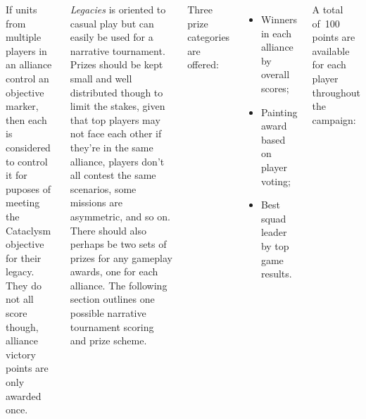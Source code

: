 \begin{columns}
 If units from multiple players in an
alliance control an objective marker, then each is considered to
control it for puposes of meeting the Cataclysm objective for their
legacy.  They do not all score though, alliance victory points are
only awarded once.

\vfill
\bigskip
\centerline{}
\clearpage


\emph{Legacies} is oriented to casual play but can easily be used for
a narrative tournament.  Prizes should be kept small and well
distributed though to limit the stakes, given that top players may not
face each other if they're in the same alliance, players don't all
contest the same scenarios, some missions are asymmetric, and so on.
There should also perhaps be two sets of prizes for any gameplay
awards, one for each alliance.  The following section outlines one
possible narrative tournament scoring and prize scheme.

 Three prize categories are offered:

\begin{itemize}\shortlist
\item Winners in each alliance by overall scores;
\item Painting award based on player voting;
\item Best squad leader by top game results.
\end{itemize}

 A total of~100 points are
available for each player throughout the campaign:


\end{columns}
